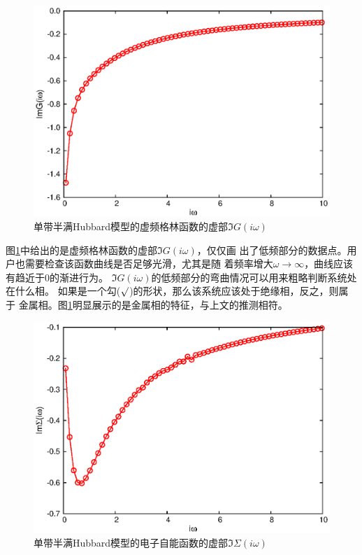\begin{figure}
\centering
\includegraphics{figure/grn.eps}
\caption{单带半满Hubbard模型的虚频格林函数的虚部$\Im G(i\omega)$} 
\label{fig:grnim}
\end{figure}

图\ref{fig:grnim}中给出的是虚频格林函数的虚部$\Im G(i\omega)$，仅仅画
出了低频部分的数据点。用户也需要检查该函数曲线是否足够光滑，尤其是随
着频率增大$\omega \rightarrow \infty$，曲线应该有趋近于0的渐进行为。
$\Im G(i\omega)$的低频部分的弯曲情况可以用来粗略判断系统处在什么相。
如果是一个勾($\surd$)的形状，那么该系统应该处于绝缘相，反之，则属于
金属相。图\ref{fig:grnim}明显展示的是金属相的特征，与上文的推测相符。

\begin{figure}
\centering
\includegraphics{figure/sgm.eps}
\caption{单带半满Hubbard模型的电子自能函数的虚部$\Im \Sigma(i\omega)$} 
\label{fig:sgmim}
\end{figure}

